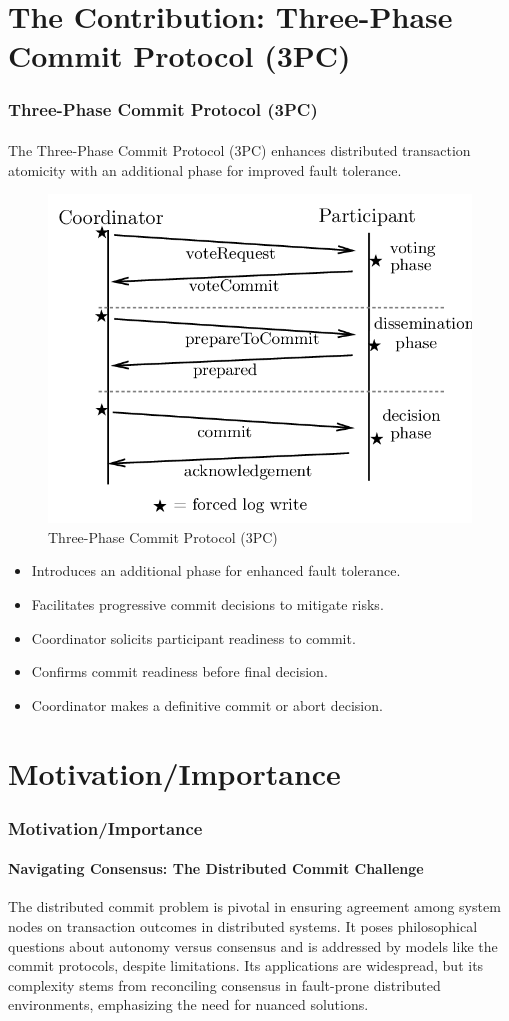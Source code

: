 \documentclass[11pt]{beamer}              %
\begin{document}
\section{The Contribution: Three-Phase Commit Protocol (3PC)}
\begin{frame}
\frametitle{Three-Phase Commit Protocol (3PC)}
\framesubtitle{}
The Three-Phase Commit Protocol (3PC) enhances distributed transaction atomicity with an additional phase for improved fault tolerance.

\begin{figure}
    \centering
    \includegraphics[scale=0.14]{figures/3PC.png}
    \caption{Three-Phase Commit Protocol (3PC)}
    \label{fig:3pc}
\end{figure}
\begin{itemize}
\item Introduces an additional phase for enhanced fault tolerance.
\item Facilitates progressive commit decisions to mitigate risks.
\item Coordinator solicits participant readiness to commit.
\item Confirms commit readiness before final decision.
\item Coordinator makes a definitive commit or abort decision.
\end{itemize}

\end{frame}


\section{Motivation/Importance}
\begin{frame}
\frametitle{Motivation/Importance}
\framesubtitle{Navigating Consensus: The Distributed Commit Challenge}
The distributed commit problem is pivotal in ensuring agreement among system nodes on transaction outcomes in distributed systems. It poses philosophical questions about autonomy versus consensus and is addressed by models like the commit protocols, despite limitations. Its applications are widespread, but its complexity stems from reconciling consensus in fault-prone distributed environments, emphasizing the need for nuanced solutions.
\end{frame}
\end{document}

